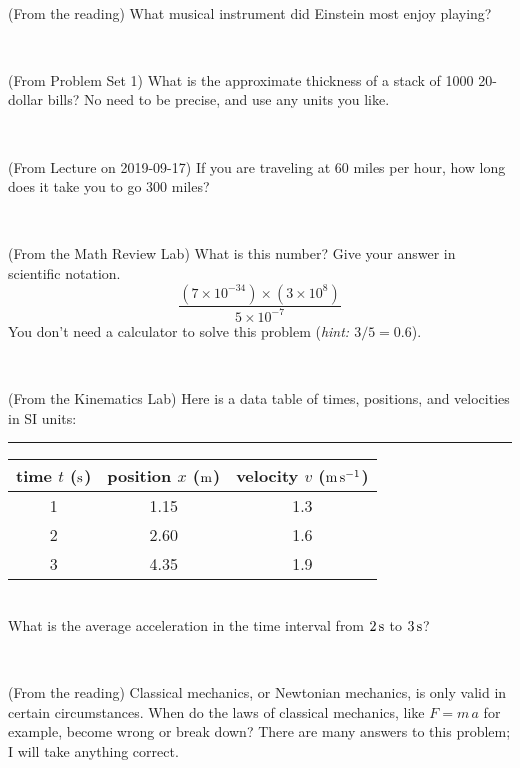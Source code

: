 \documentclass[12pt, letterpaper]{article}
\begin{document}
\vfill ~

\begin{problem} (From the reading)
What musical instrument did Einstein most enjoy playing?
\end{problem}


\vfill ~

\begin{problem} (From Problem Set 1)
What is the approximate thickness of a stack of 1000 20-dollar bills?
No need to be precise, and use any units you like.
\end{problem}


\vfill ~


\clearpage


\begin{problem} (From Lecture on 2019-09-17)
If you are traveling at 60 miles per hour, how long does
it take you to go 300 miles?
\end{problem}


\vfill ~

\begin{problem} (From the Math Review Lab)
What is this number? Give your answer in scientific notation.
$$
\frac{(7\times10^{-34})\times(3\times10^8)}{5\times10^{-7}}
$$
You don't need a calculator to solve this problem (\textit{hint: $3/5=0.6$}).
\end{problem}


\vfill ~

\begin{problem} (From the Kinematics Lab)
Here is a data table of times, positions, and velocities in SI units:\\
\rule{1.0in}{0pt}\begin{tabular}{c|c|c}
time $t$ ($\mathrm{s}$) & position $x$ ($\mathrm{m}$) & velocity $v$ ($\mathrm{m}\,\mathrm{s}^{-1}$) \\
\hline
1 & 1.15 & 1.3 \\
2 & 2.60 & 1.6 \\
3 & 4.35 & 1.9 \\
\hline
\end{tabular}\\
What is the average acceleration in the time interval from $2\,\mathrm{s}$ to $3\,\mathrm{s}$?
\end{problem}


\vfill ~

\begin{problem} (From the reading)
Classical mechanics, or Newtonian mechanics, is only valid in certain
circumstances. When do the laws of classical mechanics, like $F =
m\,a$ for example, become wrong or break down? There are many answers
to this problem; I will take anything correct.
\end{problem}
\end{document}
